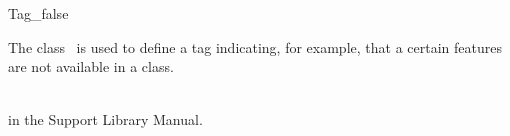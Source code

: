 \begin{ccRefClass}{Tag_false}

\ccDefinition

The class \ccRefName\ is used to define a tag indicating, for example,
that a certain features are not available in a class.


\ccSeeAlso
{} \\
 in the Support Library Manual.

\end{ccRefClass}
